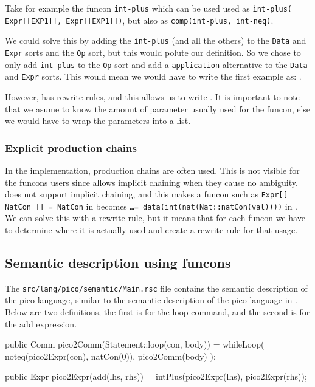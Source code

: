 \documentclass[a4paper, oneside, notitlepage]{article}
\newcommand{\ASFSDF}{\textsmaller{ASF\hspace{-.05em}\raisebox{.4ex}{\tiny\bf +}SDF}\xspace}
\newcommand{\ASF}{\textsmaller{ASF}\xspace}
\newcommand{\ADT}{\textsmaller{ADT}\xspace}
\newcommand{\filename}[1]{\texttt{#1}\xspace}
\newcommand{\code}[1]{\texttt{#1}\xspace}
\begin{document}
		Take for example the funcon \code{int-plus} which can be used used as 
		\code{int-plus(	Expr[[EXP1]], Expr[[EXP1]])}, 
		but also as 
		\code{comp(int-plus, int-neq)}.

		We could solve this by adding the \code{int-plus} (and all the others)
		to the \code{Data} and \code{Expr} sorts and the \code{Op} sort, but this would
		polute our \ADT definition.
		So we chose to only add \code{int-plus} to the \code{Op} sort and add a
		\code{application} alternative to the \code{Data} and \code{Expr} sorts.
		This would mean we would have to write the first example as:
		.

		However, \Rascal has rewrite rules, and this allows us to write 
		.
		It is important to note that we asume to know the amount of parameter
		usually used for the funcon, else we would have to wrap the parameters
		into a list.

		\subsubsection{Explicit production chains}
		In the \ASFSDF implementation, production chains are often used.
		This is not visible for the funcons users since \ASFSDF allows implicit
		chaining when they cause no ambiguity.
		\Rascal does not support implicit chaining, and this makes a funcon such
		as \code{Expr[[ NatCon ]] = NatCon} in \ASF becomes
		\code{\ldots = data(int(nat(Nat::natCon(val))))} in \Rascal.
		We can solve this with a rewrite rule, but it means that for each funcon
		we have to determine where it is actually used and create a rewrite rule
		for that usage.
	
	\subsection{Semantic description using funcons}

		The \filename{src/lang/pico/semantic/Main.rsc} file contains the semantic
		description of the pico language, similar to the semantic description of
		the pico language in \ASFSDF.
		Below are two definitions, the first is for the loop command, and the
		second is for the add expression.

\begin{rascal}
public Comm pico2Comm(Statement::loop(con, body)) =
	whileLoop( 
		noteq(pico2Expr(con), natCon(0)), 
		pico2Comm(body)
	);

public Expr pico2Expr(add(lhs, rhs)) = intPlus(pico2Expr(lhs), pico2Expr(rhs));
\end{rascal}
\end{document}
